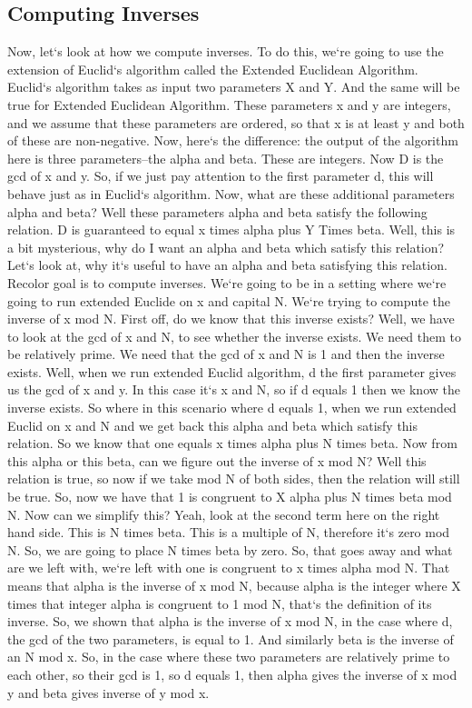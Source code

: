 \subsection{Computing Inverses}
Now, let`s look at how we compute inverses.
To do this, we`re going to use the extension of Euclid`s algorithm called the Extended Euclidean Algorithm.
Euclid`s algorithm takes as input two parameters X and Y\@.
And the same will be true for Extended Euclidean Algorithm.
These parameters x and y are integers, and we assume that these parameters are ordered, so that x is at least y and both of these are non-negative.
Now, here`s the difference: the output of the algorithm here is three parameters--the alpha and beta.
These are integers.
Now D is the gcd of x and y.
So, if we just pay attention to the first parameter d, this will behave just as in Euclid`s algorithm.
Now, what are these additional parameters alpha and beta? Well these parameters alpha and beta satisfy the following relation.
D is guaranteed to equal x times alpha plus Y Times beta.
Well, this is a bit mysterious, why do I want an alpha and beta which satisfy this relation? Let`s look at, why it`s useful to have an alpha and beta satisfying this relation.
Recolor goal is to compute inverses.
We`re going to be in a setting where we`re going to run extended Euclide on x and capital N\@.
We`re trying to compute the inverse of x mod N\@.
First off, do we know that this inverse exists? Well, we have to look at the gcd of x and N, to see whether the inverse exists.
We need them to be relatively prime.
We need that the gcd of x and N is 1 and then the inverse exists.
Well, when we run extended Euclid algorithm, d the first parameter gives us the gcd of x and y.
In this case it`s x and N, so if d equals 1 then we know the inverse exists.
So where in this scenario where d equals 1, when we run extended Euclid on x and N and we get back this alpha and beta which satisfy this relation.
So we know that one equals x times alpha plus N times beta.
Now from this alpha or this beta, can we figure out the inverse of x mod N? Well this relation is true, so now if we take mod N of both sides, then the relation will still be true.
So, now we have that 1 is congruent to X alpha plus N times beta mod N\@.
Now can we simplify this? Yeah, look at the second term here on the right hand side.
This is N times beta.
This is a multiple of N, therefore it`s zero mod N\@.
So, we are going to place N times beta by zero.
So, that goes away and what are we left with, we`re left with one is congruent to x times alpha mod N\@.
That means that alpha is the inverse of x mod N, because alpha is the integer where X times that integer alpha is congruent to 1 mod N, that`s the definition of its inverse.
So, we shown that alpha is the inverse of x mod N, in the case where d, the gcd of the two parameters, is equal to 1.
And similarly beta is the inverse of an N mod x.
So, in the case where these two parameters are relatively prime to each other, so their gcd is 1, so d equals 1, then alpha gives the inverse of x mod y and beta gives inverse of y mod x.

